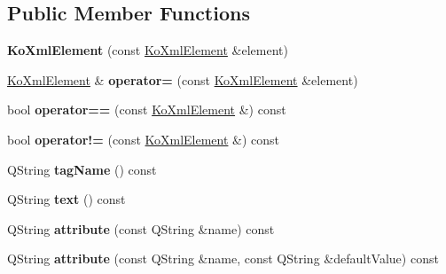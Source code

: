 \subsection*{Public Member Functions}
\begin{DoxyCompactItemize}
\item 
\hypertarget{classKoXmlElement_ab5637448b6070d8ac7a84ab56890ca10}{
{\bfseries KoXmlElement} (const \hyperlink{classKoXmlElement}{KoXmlElement} \&element)}
\label{classKoXmlElement_ab5637448b6070d8ac7a84ab56890ca10}

\item 
\hypertarget{classKoXmlElement_aeadd8e4eb16e9e3e3b9d2920fd183a34}{
\hyperlink{classKoXmlElement}{KoXmlElement} \& {\bfseries operator=} (const \hyperlink{classKoXmlElement}{KoXmlElement} \&element)}
\label{classKoXmlElement_aeadd8e4eb16e9e3e3b9d2920fd183a34}

\item 
\hypertarget{classKoXmlElement_a83343b34a11ddcbe2bb896a37ea41b1a}{
bool {\bfseries operator==} (const \hyperlink{classKoXmlElement}{KoXmlElement} \&) const }
\label{classKoXmlElement_a83343b34a11ddcbe2bb896a37ea41b1a}

\item 
\hypertarget{classKoXmlElement_a85276f0c883f6af251d52548dcb2e01f}{
bool {\bfseries operator!=} (const \hyperlink{classKoXmlElement}{KoXmlElement} \&) const }
\label{classKoXmlElement_a85276f0c883f6af251d52548dcb2e01f}

\item 
\hypertarget{classKoXmlElement_a5a89263ce785d65bce2bd068fc2bcb54}{
QString {\bfseries tagName} () const }
\label{classKoXmlElement_a5a89263ce785d65bce2bd068fc2bcb54}

\item 
\hypertarget{classKoXmlElement_a88971f674463f29dc7c5ac8923b75cd7}{
QString {\bfseries text} () const }
\label{classKoXmlElement_a88971f674463f29dc7c5ac8923b75cd7}

\item 
\hypertarget{classKoXmlElement_a155d0ddfa0e45922fb485dc686da1b66}{
QString {\bfseries attribute} (const QString \&name) const }
\label{classKoXmlElement_a155d0ddfa0e45922fb485dc686da1b66}

\item 
\hypertarget{classKoXmlElement_a0bd29a6227d6e8d9863734f5a3ed7fbd}{
QString {\bfseries attribute} (const QString \&name, const QString \&defaultValue) const }
\label{classKoXmlElement_a0bd29a6227d6e8d9863734f5a3ed7fbd}


\end{DoxyCompactItemize}
